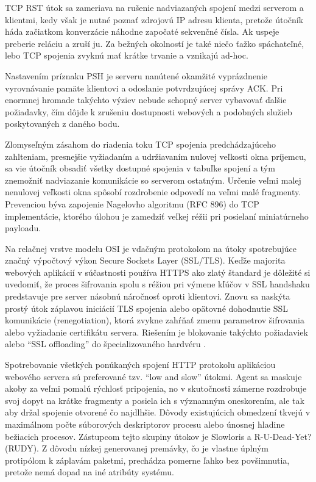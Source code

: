 \documentclass[12pt, a4paper]{article}
\begin{document}
TCP RST útok sa zameriava na rušenie nadviazaných spojení medzi serverom a klientmi, kedy však je
nutné poznať zdrojovú IP adresu klienta, pretože útočník háda začiatkom konverzácie náhodne započaté 
sekvenčné čísla. Ak uspeje preberie reláciu a zruší ju. Za bežných okolností je také niečo ťažko 
spáchateľné, lebo TCP spojenia zvyknú mať krátke trvanie a vznikajú ad-hoc.

Nastavením príznaku PSH je serveru nanútené okamžité vyprázdnenie vyrovnávanie pamäte klientovi
a odoslanie potvrdzujúcej správy ACK. Pri enormnej hromade takýchto výziev nebude schopný server
vybavovať ďalšie požiadavky, čím dôjde k zrušeniu dostupnosti webových a podobných služieb poskytovaných
z daného bodu.

Zlomyseľným zásahom do riadenia toku TCP spojenia predchádzajúceho zahlteniam, presnejšie vyžiadaním a 
udržiavaním nulovej veľkosti okna príjemcu, sa vie útočník obsadiť všetky dostupné spojenia v tabuľke
spojení a tým znemožniť nadviazanie komunikácie so serverom ostatným. Určenie veľmi malej nenulovej
veľkosti okna spôsobí rozdrobenie odpovedí na veľmi malé fragmenty. Prevenciou býva zapojenie Nagelovho
algoritmu (RFC 896) do TCP implementácie, ktorého úlohou je zamedziť veľkej réžii pri posielaní 
miniatúrneho payloadu.

Na relačnej vrstve modelu OSI je vďačným protokolom na útoky spotrebujúce značný výpočtový výkon Secure
Sockets Layer (SSL/TLS). Keďže majorita webových aplikácií v súčastnosti používa HTTPS ako zlatý štandard
je dôležité si uvedomiť, že proces šifrovania spolu s réžiou pri výmene kľúčov v SSL handshaku predstavuje 
pre server násobnú náročnosť oproti klientovi. Znovu sa naskýta prostý útok záplavou iniciácií TLS spojenia
alebo opätovné dohodnutie SSL komunikácie (renegotiation), ktorá zvykne zahŕňať zmenu parametrov šifrovania
alebo vyžiadanie certifikátu servera. Riešením je blokovanie takýchto požiadaviek alebo \enquote{SSL 
offloading} do špecializovaného hardvéru \cite{csirt-ddos}.

Spotrebovanie všetkých ponúkaných spojení HTTP protokolu aplikáciou webového servera sú preferované
tzv. \enquote{low and slow} útokmi. Agent sa maskuje akoby za veľmi pomalú rýchlosť pripojenia,
no v skutočnosti zámerne rozdrobuje svoj dopyt na krátke fragmenty a posiela ich s významným oneskorením,
ale tak aby držal spojenie otvorené čo najdlhšie. Dôvody existujúcich obmedzení tkvejú v maximálnom počte 
súborových deskriptorov procesu alebo únosnej hladine bežiacich procesov. Zástupcom tejto skupiny
útokov je Slowloris a R-U-Dead-Yet? (RUDY). Z dôvodu nízkej generovanej premávky, čo je vlastne úplným
protipólom k záplavám paketmi, prechádza pomerne ľahko bez povšimnutia, pretože nemá dopad na iné
atribúty systému.
\end{document}
